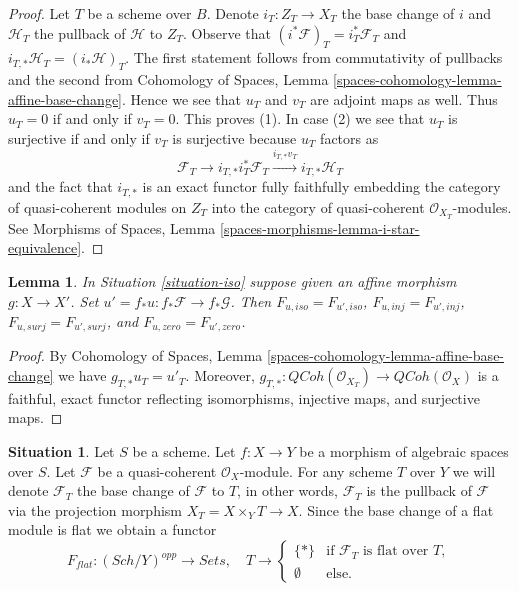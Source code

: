 \documentclass{stacks-project}
\theoremstyle{plain}
\newtheorem{lemma}[subsection]{Lemma}
\theoremstyle{definition}
\newtheorem{situation}[subsection]{Situation}
\theoremstyle{remark}
\numberwithin{equation}{subsection}
\def\Sch{\mathit{Sch}}
\def\QCoh{\mathit{QCoh}}
\begin{document}
\begin{proof}
Let $T$ be a scheme over $B$. Denote $i_T : Z_T \to X_T$
the base change of $i$ and $\mathcal{H}_T$ the pullback of $\mathcal{H}$
to $Z_T$. Observe that $(i^*\mathcal{F})_T = i_T^*\mathcal{F}_T$
and $i_{T, *}\mathcal{H}_T = (i_*\mathcal{H})_T$.
The first statement follows from commutativity of pullbacks
and the second from Cohomology of Spaces, Lemma
\ref{spaces-cohomology-lemma-affine-base-change}.
Hence we see that $u_T$ and $v_T$ are adjoint maps as well.
Thus $u_T = 0$ if and only if $v_T = 0$. This proves (1).
In case (2) we see that $u_T$ is surjective if and only if
$v_T$ is surjective because $u_T$ factors as
$$
\mathcal{F}_T \to
i_{T, *}i_T^*\mathcal{F}_T \xrightarrow{i_{T, *}v_T} i_{T, *}\mathcal{H}_T
$$
and the fact that $i_{T, *}$ is an exact functor
fully faithfully embedding the category of quasi-coherent modules on
$Z_T$ into the category of quasi-coherent $\mathcal{O}_{X_T}$-modules.
See Morphisms of Spaces, Lemma \ref{spaces-morphisms-lemma-i-star-equivalence}.
\end{proof}

\begin{lemma}
\label{lemma-relate-zero-affine-push}
In Situation \ref{situation-iso} suppose given an affine morphism
$g : X \to X'$. Set $u' = f_*u : f_*\mathcal{F} \to f_*\mathcal{G}$.
Then $F_{u, iso} = F_{u', iso}$, $F_{u, inj} = F_{u', inj}$,
$F_{u, surj} = F_{u', surj}$, and $F_{u, zero} = F_{u', zero}$.
\end{lemma}

\begin{proof}
By Cohomology of Spaces, Lemma
\ref{spaces-cohomology-lemma-affine-base-change}
we have $g_{T, *}u_T = u'_T$.
Moreover, $g_{T, *} : \QCoh(\mathcal{O}_{X_T}) \to \QCoh(\mathcal{O}_X)$
is a faithful, exact functor reflecting isomorphisms, injective maps,
and surjective maps.
\end{proof}

\begin{situation}
\label{situation-flat}
Let $S$ be a scheme.
Let $f : X \to Y$ be a morphism of algebraic spaces over $S$.
Let $\mathcal{F}$ be a quasi-coherent $\mathcal{O}_X$-module.
For any scheme $T$ over $Y$ we will denote $\mathcal{F}_T$ the
base change of $\mathcal{F}$ to $T$, in other words, $\mathcal{F}_T$
is the pullback of $\mathcal{F}$ via the projection morphism
$X_T = X \times_Y T \to X$. Since the base change of a flat module
is flat we obtain a functor
\begin{equation}
\label{equation-flat}
F_{flat} : (\Sch/Y)^{opp} \longrightarrow \textit{Sets}, \quad
T \longrightarrow \left\{
\begin{matrix}
\{*\} & \text{if } \mathcal{F}_T \text{ is flat over }T, \\
\emptyset & \text{else.}
\end{matrix}
\right.
\end{equation}
\end{situation}
\end{document}
